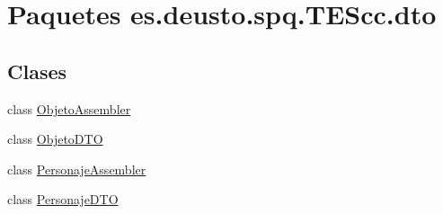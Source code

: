 \hypertarget{namespacees_1_1deusto_1_1spq_1_1_t_e_scc_1_1dto}{\section{Paquetes es.\+deusto.\+spq.\+T\+E\+Scc.\+dto}
\label{namespacees_1_1deusto_1_1spq_1_1_t_e_scc_1_1dto}
}
\subsection*{Clases}
\begin{DoxyCompactItemize}
\item 
class \hyperlink{classes_1_1deusto_1_1spq_1_1_t_e_scc_1_1dto_1_1_objeto_assembler}{Objeto\+Assembler}
\item 
class \hyperlink{classes_1_1deusto_1_1spq_1_1_t_e_scc_1_1dto_1_1_objeto_d_t_o}{Objeto\+D\+T\+O}
\item 
class \hyperlink{classes_1_1deusto_1_1spq_1_1_t_e_scc_1_1dto_1_1_personaje_assembler}{Personaje\+Assembler}
\item 
class \hyperlink{classes_1_1deusto_1_1spq_1_1_t_e_scc_1_1dto_1_1_personaje_d_t_o}{Personaje\+D\+T\+O}
\end{DoxyCompactItemize}
